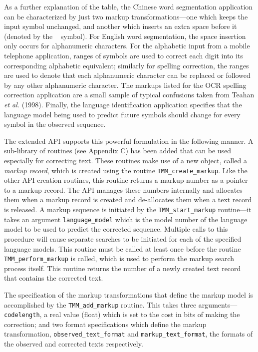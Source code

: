 \documentclass[11pt]{article}
\begin{document}
As a further explanation of the table, the Chinese word segmentation application can be characterized by just two
markup transformations---one which keeps the input symbol unchanged,
and another which inserts an extra space before it (denoted by the \verb*| | symbol).
For English word segmentation, the space insertion only occurs for alphanumeric characters. For the
alphabetic input from a mobile telephone application, ranges of symbols are used to correct each digit into
its corresponding alphabetic equivalent; similarly for spelling correction, the ranges are used
to denote that each alphanumeric character can be replaced or followed by any other alphanumeric character.
The markups listed for the OCR spelling correction application are a small sample of typical confusions
taken from Teahan {\em et al.} (1998). Finally, the language identification application specifies that
the language model being used to predict future symbols should change for every symbol in the observed sequence.

The extended API supports this powerful formulation in the following manner.
A sub-library of routines (see Appendix C) has been added that can be used especially
for correcting text. These routines make use of a new object, called a {\em markup record},
which is created using the routine \verb|TMM_create_markup|. Like the other API creation routines,
this routine returns a markup number as a pointer to a markup record.
The API manages these numbers internally and allocates them when a markup record is created
and de-allocates them when a text record is released. A markup sequence is initiated by the
\verb|TMM_start_markup| routine---it takes an argument \verb|language_model| which is the
model number of the language model to be used to predict the corrected sequence.
Multiple calls to this procedure will cause
separate searches to be initiated for each of the specified language models.
This routine must be called at least once before the routine \verb|TMM_perform_markup| is called, which is
used to perform the markup search process itself. This routine returns the number of a newly created text record
that contains the corrected text.

The specification of the markup transformations that define the markup model is accomplished
by the \verb|TMM_add_markup| routine. This takes three arguments---\verb|codelength|,
a real value (float) which is set to the cost in bits of making the correction; and two
format specifications which define the markup transformation, \verb|observed_text_format| and \verb|markup_text_format|,
the formats of the observed and corrected texts respectively.
\end{document}
